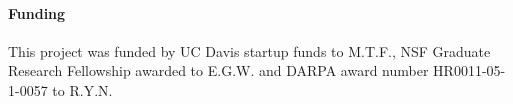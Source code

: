 \documentclass{bioinfo}
\begin{document}
\paragraph{Funding\textcolon} 

This project was funded by UC Davis startup funds to M.T.F., NSF Graduate
Research Fellowship awarded to E.G.W. and DARPA award number
HR0011-05-1-0057 to R.Y.N.

%
%
%
%
%




\end{document}
